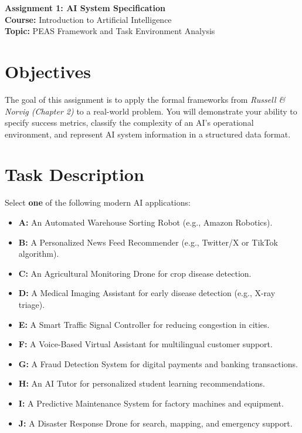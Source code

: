 \documentclass[11pt]{article}
\begin{document}
\begin{center}
    {\huge \textbf{Assignment 1: AI System Specification}} \\
    \vspace{0.2cm}
    {\large \textbf{Course:} Introduction to Artificial Intelligence} \\
    \textbf{Topic:} PEAS Framework and Task Environment Analysis \\
    \vspace{0.5cm}
\end{center}

\section{Objectives}
The goal of this assignment is to apply the formal frameworks from \textit{Russell \& Norvig (Chapter 2)} to a real-world problem. You will demonstrate your ability to specify success metrics, classify the complexity of an AI's operational environment, and represent AI system information in a structured data format.

\section{Task Description}
Select \textbf{one} of the following modern AI applications:
\begin{itemize}[noitemsep]
    \item \textbf{A:} An Automated Warehouse Sorting Robot (e.g., Amazon Robotics).
    \item \textbf{B:} A Personalized News Feed Recommender (e.g., Twitter/X or TikTok algorithm).
    \item \textbf{C:} An Agricultural Monitoring Drone for crop disease detection.
    \item \textbf{D:} A Medical Imaging Assistant for early disease detection (e.g., X-ray triage).
    \item \textbf{E:} A Smart Traffic Signal Controller for reducing congestion in cities.
    \item \textbf{F:} A Voice-Based Virtual Assistant for multilingual customer support.
    \item \textbf{G:} A Fraud Detection System for digital payments and banking transactions.
    \item \textbf{H:} An AI Tutor for personalized student learning recommendations.
    \item \textbf{I:} A Predictive Maintenance System for factory machines and equipment.
    \item \textbf{J:} A Disaster Response Drone for search, mapping, and emergency support.
\end{itemize}
\end{document}
